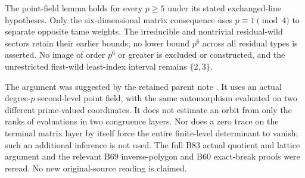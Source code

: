 \begin{remark}
\label{rem:B-RD85-scope}
The point-field lemma holds for every \(p\ge5\) under
its stated exchanged-line hypotheses. Only the
six-dimensional matrix consequence uses
\(p\equiv1\pmod4\) to separate opposite tame weights.
The irreducible and nontrivial residual-wild sectors
retain their earlier bounds; no lower bound \(p^6\)
across all residual types is asserted. No image of order
\(p^6\) or greater is excluded or constructed, and the
unrestricted first-wild least-index interval remains
\(\{2,3\}\).

The argument was suggested by the retained parent note
. It uses an
actual degree-\(p\) second-level point field, with the
same automorphism evaluated on two different prime-valued
coordinates. It does not estimate an orbit from only
the ranks of evaluations in two congruence layers.
Nor does a zero trace on the terminal matrix layer by
itself force the entire finite-level determinant to
vanish; such an additional inference is not used.
The full B83 actual quotient and lattice argument and
the relevant B69 inverse-polygon and B60 exact-break
proofs were reread. No new original-source reading is
claimed.
\end{remark}

